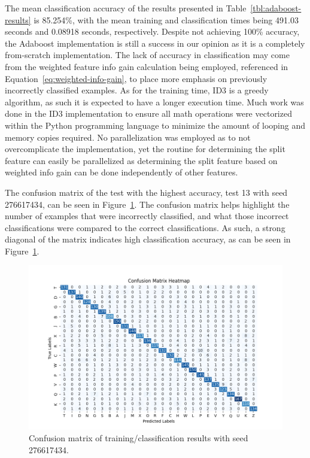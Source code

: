 \documentclass[a4paper]{article}
\begin{document}
The mean classification accuracy of the results presented in Table~\ref{tbl:adaboost-results} is 85.254\%, with the mean training and classification times being 491.03 seconds and 0.08918 seconds, respectively. Despite not achieving 100\% accuracy, the Adaboost implementation is still a success in our opinion as it is a completely from-scratch implementation. The lack of accuracy in classification may come from the weighted feature info gain calculation being employed, referenced in Equation~\ref{eq:weighted-info-gain}, to place more emphasis on previously incorrectly classified examples. As for the training time, ID3 is a greedy algorithm, as such it is expected to have a longer execution time. Much work was done in the ID3 implementation to ensure all math operations were vectorized within the Python programming language to minimize the amount of looping and memory copies required. No parallelization was employed as to not overcomplicate the implementation, yet the routine for determining the split feature can easily be parallelized as determining the split feature based on weighted info gain can be done independently of other features.

The confusion matrix of the test with the highest accuracy, test 13 with seed 276617434, can be seen in Figure~\ref{fig:confusion-matrix}. The confusion matrix helps highlight the number of examples that were incorrectly classified, and what those incorrect classifications were compared to the correct classifications. As such, a strong diagonal of the matrix indicates high classification accuracy, as can be seen in Figure~\ref{fig:confusion-matrix}.

\begin{figure}[h!]
    \centering
    \includegraphics[scale=0.65]{images/confusion-matrix.png}
    \caption{Confusion matrix of training/classification results with seed 276617434.}
    \label{fig:confusion-matrix}
\end{figure}
\end{document}
